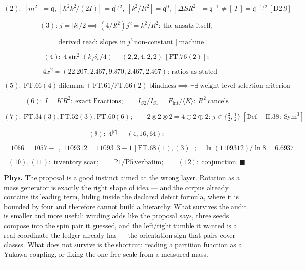 \documentclass[11pt,openany]{report}
\theoremstyle{canonplain}
\theoremstyle{canondef}
\begin{document}
\[
(2):\ [m^2]=\mathfrak q,\ [\hbar^2k^2/(2I)]=\mathfrak q^{1/2},\ [k^2/R^2]=\mathfrak q^0,\ [\Delta S R^2]=\mathfrak q^{-1}\ne[\ I\ ]=\mathfrak q^{-1/2}\ [\mathrm{D2.9}]
\]

\[
(3):\ j=|k|/2\implies(4/R^2)j^2=k^2/R^2:\ \text{the ansatz itself};
\]

\[
\qquad \text{derived read}:\ \text{slopes in}\ j^2\ \text{non-constant}\ [\text{machine}]
\]

\[
(4):\ 4\sin^2(k_f\delta_v/4)=(2,2,4,2,2)\ [\mathrm{FT.76}(2)];
\]

\[
\quad 4x^2=(22.207,2.467,9.870,2.467,2.467):\ \text{ratios as stated}
\]

\[
(5):\ \mathrm{FT.66}(4)\ \text{dilemma}+\mathrm{FT.61}/\mathrm{FT.66}(2)\ \text{blindness}\implies\neg\exists\ \text{weight-level selection criterion}
\]

\[
(6):\ I=KR^2:\ \text{exact Fractions};\qquad I_{S2}/I_{S1}=E_{\mathrm{int}}/\langle K\rangle:\ R^2\ \text{cancels}
\]

\[
(7):\ \mathrm{FT.34}(3),\mathrm{FT.52}(3),\mathrm{FT.60}(6);\qquad2\otimes2\otimes2=4\oplus2\oplus2:\ j\in\{\tfrac32,\tfrac12\}\ [\mathrm{Def-H.38}:\ \mathrm{Sym}^3]
\]

\[
(9):\ 4^{|\mathcal C|}=(4,16,64);
\]

\[
\quad 1056=1057-1,\ 1109312=1109313-1\ [\mathrm{FT.68}(1),(3)];\quad\ln(1109312)/\ln8=6.6937
\]

\[
(10),(11):\ \text{inventory scan};\qquad\mathrm{P1}/\mathrm{P5}\ \text{verbatim};\qquad(12):\ \text{conjunction}.\ \blacksquare
\]

\textbf{Phys.} The proposal is a good instinct aimed at the wrong layer. Rotation as a mass generator is exactly the right shape of idea — and the corpus already contains its leading term, hiding inside the declared defect formula, where it is bounded by four and therefore cannot build a hierarchy. What survives the audit is smaller and more useful: winding adds like the proposal says, three seeds compose into the spin pair it guessed, and the left/right tumble it wanted is a real coordinate the ledger already has — the orientation sign that pairs cover classes. What does not survive is the shortcut: reading a partition function as a Yukawa coupling, or fixing the one free scale from a measured mass.

\vspace{2pt}\noindent\rule{\textwidth}{0.4pt}\vspace{2pt}
\end{document}
